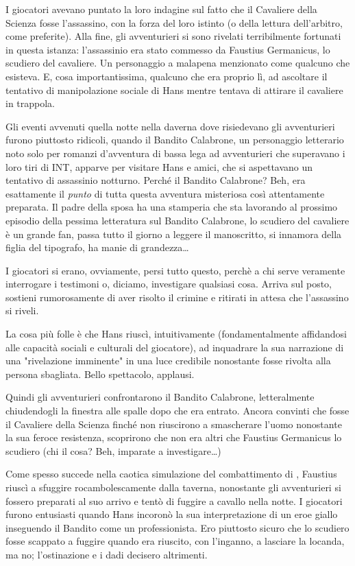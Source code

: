I giocatori avevano puntato la loro indagine sul fatto che il Cavaliere della Scienza fosse l'assassino, con la forza del loro istinto (o della lettura dell'arbitro, come preferite). Alla fine, gli avventurieri si sono rivelati terribilmente fortunati in questa istanza: l'assassinio era stato commesso da Faustius Germanicus, lo scudiero del cavaliere. Un personaggio a malapena menzionato come qualcuno che esisteva. E, cosa importantissima, qualcuno che era proprio lì, ad ascoltare il tentativo di manipolazione sociale di Hans mentre tentava di attirare il cavaliere in trappola.

Gli eventi avvenuti quella notte nella daverna dove risiedevano gli avventurieri furono piuttosto ridicoli, quando il Bandito Calabrone, un personaggio letterario noto solo per romanzi d'avventura di bassa lega ad avventurieri che superavano i loro tiri di INT, apparve per visitare Hans e amici, che si aspettavano un tentativo di assassinio notturno. Perché il Bandito Calabrone? Beh, era esattamente il \textit{punto} di tutta questa avventura misteriosa così attentamente preparata. Il padre della sposa ha una stamperia che sta lavorando al prossimo episodio della pessima letteratura sul Bandito Calabrone, lo scudiero del cavaliere è un grande fan, passa tutto il giorno a leggere il manoscritto, si innamora della figlia del tipografo, ha manie di grandezza\dots

I giocatori si erano, ovviamente, persi tutto questo, perchè a chi serve veramente interrogare i testimoni o, diciamo, investigare qualsiasi cosa. Arriva sul posto, sostieni rumorosamente di aver risolto il crimine e ritirati in attesa che l'assassino si riveli.

La cosa più folle è che Hans riuscì, intuitivamente (fondamentalmente affidandosi alle capacità sociali e culturali del giocatore), ad inquadrare la sua narrazione di una "rivelazione imminente" in una luce credibile nonostante fosse rivolta alla persona sbagliata. Bello spettacolo, applausi.

Quindi gli avventurieri confrontarono il Bandito Calabrone, letteralmente chiudendogli la finestra alle spalle dopo che era entrato. Ancora convinti che fosse il Cavaliere della Scienza finché non riuscirono a smascherare l'uomo nonostante la sua feroce resistenza, scoprirono che non era altri che Faustius Germanicus lo scudiero (chi il cosa? Beh, imparate a investigare\dots)

Come spesso succede nella caotica simulazione del combattimento di \dnd, Faustius riuscì a sfuggire rocambolescamente dalla taverna, nonostante gli avventurieri si fossero preparati al suo arrivo e tentò di fuggire a cavallo nella notte. I giocatori furono entusiasti quando Hans incoronò la sua interpretazione di un eroe giallo inseguendo il Bandito come un professionista. Ero piuttosto sicuro che lo scudiero fosse scappato a fuggire quando era riuscito, con l'inganno, a lasciare la locanda, ma no; l'ostinazione e i dadi decisero altrimenti.

